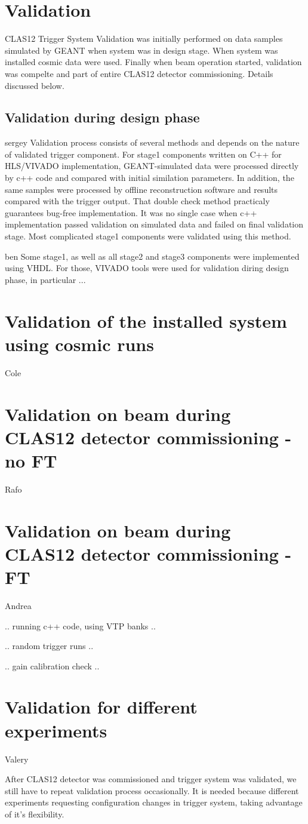 \section{Validation}

CLAS12 Trigger System Validation was initially performed on data samples simulated by GEANT when system was in design stage. When system was installed cosmic data were used. Finally when beam operation started, validation was compelte and part of entire CLAS12 detector commissioning. Details discussed below.

\subsection{Validation during design phase}

sergey
Validation process consists of several methods and depends on the nature of validated trigger component. For stage1 components written on C++ for HLS/VIVADO implementation, GEANT-simulated data were processed directly by c++ code and compared with initial similation parameters. In addition, the same samples were processed by offline reconstruction software and results compared with the trigger output. That double check method practicaly guarantees bug-free implementation. It was no single case when c++ implementation passed validation on simulated data and failed on final validation stage. Most complicated stage1 components were validated using this method.

ben
Some stage1, as well as all stage2 and stage3 components were implemented using VHDL. For those, VIVADO tools were used for validation diring design phase, in particular ...

\section{Validation of the installed system using cosmic runs} Cole

\section{Validation on beam during CLAS12 detector commissioning - no FT} Rafo

\section{Validation on beam during CLAS12 detector commissioning - FT} Andrea


.. running c++ code, using VTP banks ..

.. random trigger runs .. 

.. gain calibration check .. 


\section{Validation for different experiments} Valery

After CLAS12 detector was commissioned and trigger system was validated, we still have to repeat validation process occasionally. It is needed because different experiments requesting configuration changes in trigger system, taking advantage of it's flexibility.